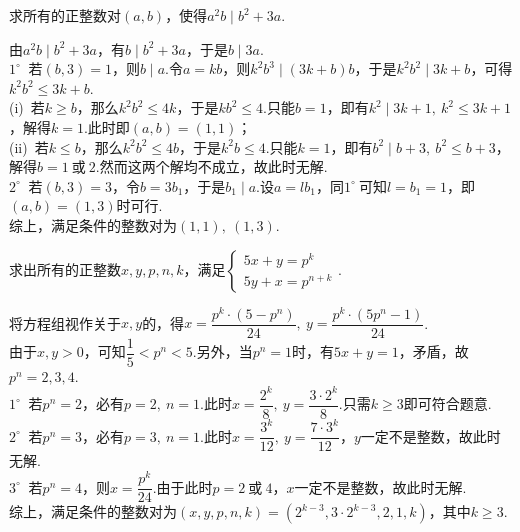 \documentclass[cn,hazy,black,10pt,normal]{elegantnote}
\newcommand{\cor}{~\textit{或}~}
\newcommand{\buzhou}[1]{$#1^{\circ} \ $}
\begin{document}
\begin{cproblem} %
	求所有的正整数对$(a,b)$，使得$a^2b \mid b^2+3a$.
\end{cproblem}
\begin{solution}
	由$a^2b \mid b^2+3a$，有$b \mid b^2+3a$，于是$b \mid 3a$. \\
	\buzhou{1} 若$(b,3)=1$，则$b \mid a$.令$a=kb$，则$k^2b^3 \mid (3k+b)b$，于是$k^2b^2 \mid 3k+b$，可得$k^2b^2 \leq 3k+b$. \\
	(i)~若$k \geq b$，那么$k^2b^2 \leq 4k$，于是$kb^2 \leq 4$.只能$b=1$，即有$k^2 \mid 3k+1,~k^2 \leq 3k+1$，解得$k=1$.此时即$(a,b)=(1,1)$； \\
	(ii)~若$k \leq b$，那么$k^2b^2 \leq 4b$，于是$k^2b \leq 4$.只能$k=1$，即有$b^2 \mid b+3,~b^2 \leq b+3$，解得$b=1\cor 2$.然而这两个解均不成立，故此时无解. \\
	\buzhou{2} 若$(b,3)=3$，令$b=3b_1$，于是$b_1 \mid a$.设$a=l b_1$，同\buzhou{1}可知$l=b_1=1$，即$(a,b)=(1,3)$时可行. \\
	综上，满足条件的整数对为$(1,1),~(1,3)$.
\end{solution}

\begin{cproblem} %
	求出所有的正整数$x,y,p,n,k$，满足$\begin{cases}
		5x+y=p^k \\ 5y+x=p^{n+k}
	\end{cases}$.
\end{cproblem}
\begin{solution}
	将方程组视作关于$x,y$的，得$x=\dfrac{p^k \cdot (5-p^n)}{24},~y=\dfrac{p^k \cdot (5p^n-1)}{24}$. \\
	由于$x,y>0$，可知$\dfrac{1}{5} < p^n < 5$.另外，当$p^n=1$时，有$5x+y=1$，矛盾，故$p^n=2,3,4$. \\
	\buzhou{1} 若$p^n=2$，必有$p=2,~n=1$.此时$x=\dfrac{2^k}{8},~y=\dfrac{3 \cdot 2^k}{8}$.只需$k \geq 3$即可符合题意. \\
	\buzhou{2} 若$p^n=3$，必有$p=3,~n=1$.此时$x=\dfrac{3^k}{12},~y=\dfrac{7 \cdot 3^k}{12}$，$y$一定不是整数，故此时无解. \\
	\buzhou{3} 若$p^n=4$，则$x=\dfrac{p^k}{24}$.由于此时$p=2\cor 4$，$x$一定不是整数，故此时无解. \\
	综上，满足条件的整数对为$(x,y,p,n,k)=(2^{k-3},3\cdot 2^{k-3},2,1,k)$，其中$k \geq 3$.
\end{solution}
\end{document}
